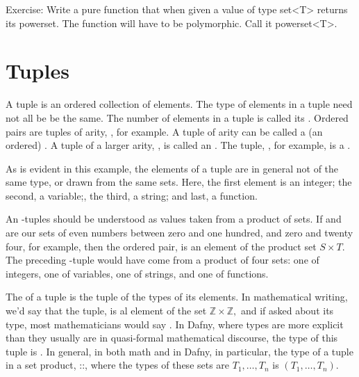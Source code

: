 \documentclass[letterpaper,10pt,english]{sphinxmanual}
\begin{document}
Exercise: Write a pure function that when given a value of type set\textless{}T\textgreater{}
returns its powerset. The function will have to be polymorphic.  Call
it powerset\textless{}T\textgreater{}.


\section{Tuples}
\label{\detokenize{07-set-theory:tuples}}
A tuple is an ordered collection of elements. The type of elements in
a tuple need not all be be the same. The number of elements in a tuple
is called its . Ordered pairs are tuples of arity, , for
example. A tuple of arity  can be called a (an ordered) .
A tuple of a larger arity, , is called an .  The tuple,
, for example, is a .

As is evident in this example, the elements of a tuple are in general
not of the same type, or drawn from the same sets. Here, the first
element is an integer; the second, a variable;, the third, a string;
and last, a function.

An -tuples should be understood as values taken from a product of
 sets.  If  and  are our sets of even numbers between zero
and one hundred, and zero and twenty four, for example, then the
ordered pair,  is an element of the product set \(S
\times T\).  The preceding -tuple would have come from a product of
four sets: one of integers, one of variables, one of strings, and one
of functions.

The  of a tuple is the tuple of the types of its elements. In
mathematical writing, we’d say that the tuple,  is al element
of the set \({\mathbb Z} \times {\mathbb Z},\) and if asked about
its type, most mathematicians would say . In Dafny,
where types are more explicit than they usually are in quasi-formal
mathematical discourse, the type of this tuple is . In
general, in both math and in Dafny, in particular, the type of a tuple
in a set product, ::, where
the types of these sets are \(T_1, \ldots, T_n\) is \((T_1,
\ldots, T_n)\).
\end{document}
